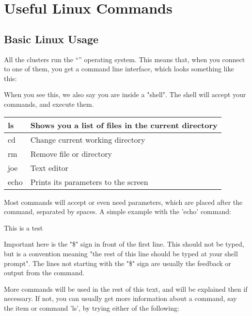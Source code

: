 \chapter{Useful Linux Commands}

\section{Basic Linux Usage}

All the \hpc clusters run the ``\operatingsystem'' operating system.  This
means that, when you connect to one of them, you get a command line interface,
which looks something like this:

\begin{prompt}
\end{prompt}

When you see this, we also say you are inside a "shell". The shell will accept
your commands, and execute them.

\begin{tabular}{|l|l|} \hline
ls   & Shows you a list of files in the current directory \\ \hline
cd   & Change current working directory \\ \hline
rm   & Remove file or directory \\ \hline
joe  & Text editor \\ \hline
echo & Prints its parameters to the screen \\ \hline
\end{tabular}

Most commands will accept or even need parameters, which are placed after the
command, separated by spaces. A simple example with the 'echo' command:

\begin{prompt}
This is a test
\end{prompt}

Important here is the "\$" sign in front of the first line. This should not be
typed, but is a convention meaning "the rest of this line should be typed at
your shell prompt". The lines not starting with the "\$" sign are usually the
feedback or output from the command.

More commands will be used in the rest of this text, and will be explained then
if necessary. If not, you can usually get more information about a command, say
the item or command 'ls', by trying either of the following:

\begin{prompt}
\end{prompt}

